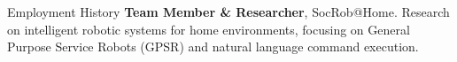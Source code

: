 \begin{rubric}{Employment History}
\entry*[2022--Present]%
    \textbf{Team Member \& Researcher}, SocRob@Home.    Research on intelligent robotic systems for home environments, focusing on General Purpose Service Robots (GPSR) and natural language command execution.%
\end{rubric}